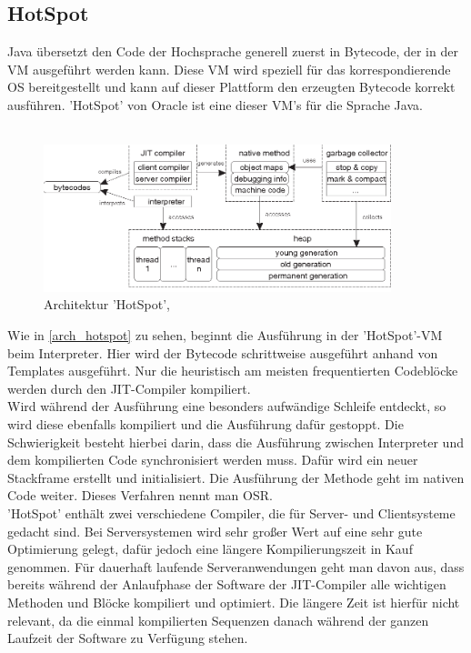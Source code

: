 \subsection{HotSpot}
Java übersetzt den Code der Hochsprache generell zuerst in Bytecode, der in der \ac{VM} ausgeführt werden kann. Diese \ac{VM} wird speziell für das korrespondierende \ac{OS} bereitgestellt und kann auf dieser Plattform den erzeugten Bytecode korrekt ausführen. 'HotSpot' von Oracle ist eine dieser \ac{VM}'s für die Sprache Java. \\
\\
\begin{figure}[ht]
    \begin{center}
        \includegraphics[width=0.9\textwidth]{assets/img/3-Figure1-1.png}
        \caption{Architektur 'HotSpot', \cite[Quelle: Kotzmann Wimmer 2008]{KotzmannWimmer2008}}
        \label{arch_hotspot}
    \end{center}
\end{figure}
Wie in \autoref{arch_hotspot} zu sehen, beginnt die Ausführung in der 'HotSpot'-\ac{VM} beim Interpreter. Hier wird der Bytecode schrittweise ausgeführt anhand von Templates ausgeführt. Nur die heuristisch am meisten frequentierten Codeblöcke werden durch den \ac{JIT}-Compiler kompiliert.\\
Wird während der Ausführung eine besonders aufwändige Schleife entdeckt, so wird diese ebenfalls kompiliert und die Ausführung dafür gestoppt. Die Schwierigkeit besteht hierbei darin, dass die Ausführung zwischen Interpreter und dem kompilierten Code synchronisiert werden muss. Dafür wird ein neuer Stackframe erstellt und initialisiert. Die Ausführung der Methode geht im nativen Code weiter. Dieses Verfahren nennt man \ac{OSR}.\\
'HotSpot' enthält zwei verschiedene Compiler, die für Server- und Clientsysteme gedacht sind. Bei Serversystemen wird sehr großer Wert auf eine sehr gute Optimierung gelegt, dafür jedoch eine längere Kompilierungszeit in Kauf genommen. Für dauerhaft laufende Serveranwendungen geht man davon aus, dass bereits während der Anlaufphase der Software der \ac{JIT}-Compiler alle wichtigen Methoden und Blöcke kompiliert und optimiert. Die längere Zeit ist hierfür nicht relevant, da die einmal kompilierten Sequenzen danach während der ganzen Laufzeit der Software zu Verfügung stehen.\\
